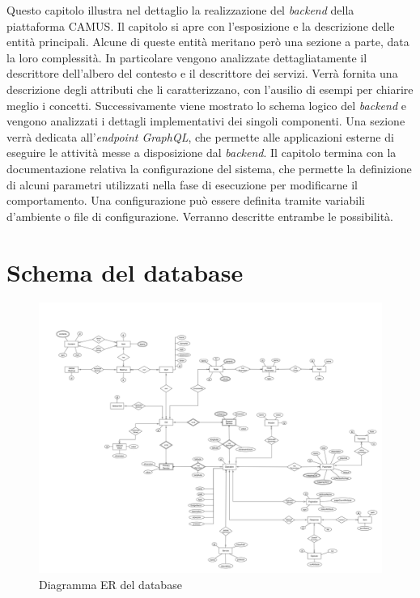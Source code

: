 Questo capitolo illustra nel dettaglio la realizzazione del \emph{backend} della piattaforma CAMUS. Il capitolo si apre con l'esposizione e la descrizione delle entità principali. Alcune di queste entità meritano però una sezione a parte, data la loro complessità. In particolare vengono analizzate dettagliatamente il descrittore dell'albero del contesto e il descrittore dei servizi. Verrà fornita una descrizione degli attributi che li caratterizzano, con l'ausilio di esempi per chiarire meglio i concetti. Successivamente viene mostrato lo schema logico del \emph{backend} e vengono analizzati i dettagli implementativi dei singoli componenti. Una sezione verrà dedicata all'\emph{endpoint GraphQL}, che permette alle applicazioni esterne di eseguire le attività messe a disposizione dal \emph{backend}. Il capitolo termina con la documentazione relativa la configurazione del sistema, che permette la definizione di alcuni parametri utilizzati nella fase di esecuzione per modificarne il comportamento. Una configurazione può essere definita tramite variabili d'ambiente o file di configurazione. Verranno descritte entrambe le possibilità.

\section{Schema del database\label{sec:schema-database}}

\begin{figure}[p]
	\centering
	\includegraphics[height=\textwidth, angle=90]{5-implementazione-backend/Immagini/schema_er_db.png}
	\caption{Diagramma ER del database}\label{fig:schema-er-db}
\end{figure}

